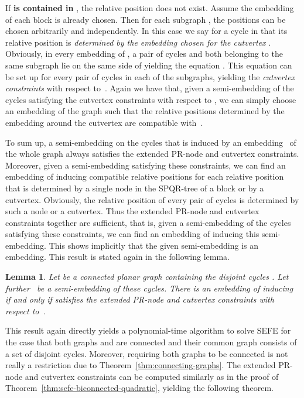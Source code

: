 \documentclass{scrartcl}
\newcommand{\1}[1]{{\normalfont \ensuremath{#1^{\tiny\circled{1}}}}} \newcommand{\2}[1]{{\normalfont \ensuremath{#1^{\tiny\circled{2}}}}} \renewcommand{\k}[1]{{\normalfont \ensuremath{#1^{\tiny\circled{k}}}}} \newcommand{\proj}[2]{\ensuremath{\left.#1\right|_{#2}}} \newcommand{\eps}{\varepsilon}
\theoremstyle{plain} \newtheorem{theorem}{Theorem} \newcounter{lemmacounter} \setcounter{lemmacounter}{0} \newtheorem{lemma}[lemmacounter]{Lemma} \newtheorem{fact}{Fact}  \newtheorem{corollary}{Corollary} \theoremstyle{definition} \newtheorem{definition}{Definition}
\begin{document}
If {\bf  is contained in }, the
relative position  does not exist.  Assume the embedding
of each block is already chosen.  Then for each subgraph , the positions  can be chosen
arbitrarily and independently.  In this case we say for a cycle 
in  that its relative position  is \emph{determined
  by the embedding chosen for the cutvertex }.  Obviously, in every
embedding of , a pair of cycles  and  both belonging to
the same subgraph  lie on the same side
of  yielding the equation .  This
equation can be set up for every pair of cycles in each of the
subgraphs, yielding the \emph{cutvertex constraints} with respect
to~.  Again we have that, given a semi-embedding  of the cycles satisfying the cutvertex constraints
with respect to , we can simply choose an embedding of the graph
such that the relative positions determined by the embedding around
the cutvertex are compatible with~.

To sum up, a semi-embedding  on the cycles
 that is induced by an
embedding~ of the whole graph always satisfies the
extended PR-node and cutvertex constraints.  Moreover, given a
semi-embedding  satisfying these constraints,
we can find an embedding  of  inducing compatible
relative positions for each relative position that is determined by a
single node in the SPQR-tree of a block or by a cutvertex.  Obviously,
the relative position of every pair of cycles is determined by such a
node or a cutvertex.  Thus the extended PR-node and cutvertex
constraints together are sufficient, that is, given a semi-embedding
of the cycles satisfying these constraints, we can find an embedding
of  inducing this semi-embedding.  This shows implicitly that the
given semi-embedding is an embedding.  This result is stated again in
the following lemma.

\begin{lemma}
  \label{lem:ext-PR-node-cutvert-constraints}
  Let  be a connected planar graph containing the disjoint cycles
  .  Let further~ be a semi-embedding of these cycles.  There is an embedding
   of  inducing~ if and only
  if  satisfies the extended PR-node and
  cutvertex constraints with respect to~.
\end{lemma}

This result again directly yields a polynomial-time algorithm to solve
{\sc SEFE} for the case that both graphs  and  are connected
and their common graph  consists of a set of disjoint cycles.
Moreover, requiring both graphs to be connected is not really a
restriction due to Theorem~\ref{thm:connecting-graphs}.  The extended
PR-node and cutvertex constraints can be computed similarly as in the
proof of Theorem~\ref{thm:sefe-biconnected-quadratic}, yielding the
following theorem.
\end{document}
